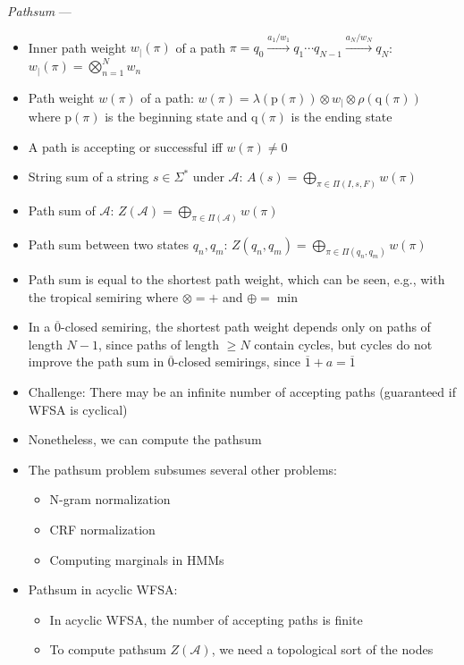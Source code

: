 \emph{Pathsum} ---
\begin{itemize}
    \item Inner path weight $w_\mid(\pi)$ of a path $\pi = q_0 \xrightarrow{a_1/w_1} q_1 \cdots q_{N-1} \xrightarrow{a_N/w_N} q_N$:
    $
    w_\mid(\pi) = \bigotimes_{n=1}^N w_n
    $
    \item Path weight $w(\pi)$ of a path:
    $
    w(\pi) = \lambda(\textrm{p}(\pi)) \otimes w_\mid \otimes \rho(\textrm{q}(\pi))
    $
    where $\textrm{p}(\pi)$ is the beginning state and $\textrm{q}(\pi)$ is the ending state
    \item A path is accepting or successful iff $w(\pi) \neq 0$
    \item String sum of a string $s \in \Sigma^*$ under $\mathcal{A}$:
    $
    A(s) = \bigoplus_{\pi \in \Pi(I, s, F)} w(\pi)
    $
    \item Path sum of $\mathcal{A}$:
    $
    Z(\mathcal{A}) = \bigoplus_{\pi \in \Pi(\mathcal{A})} w(\pi)
    $
    \item Path sum between two states $q_n, q_m$:
    $
    Z(q_n, q_m) = \bigoplus_{\pi \in \Pi(q_n, q_m)} w(\pi)
    $
    \item Path sum is equal to the shortest path weight, which can be seen, e.g., with the tropical semiring where $\otimes = +$ and $\oplus = \min$
    \item In a $\overline{0}$-closed semiring, the shortest path weight depends only on paths of length $N-1$, since paths of length $\geq N$ contain cycles, but cycles do not improve the path sum in $\overline{0}$-closed semirings, since $\overline{1} + a = \overline{1}$
    \item Challenge: There may be an infinite number of accepting paths (guaranteed if WFSA is cyclical)
    \item Nonetheless, we can compute the pathsum
    \item The pathsum problem subsumes several other problems:
    \begin{itemize}
        \item N-gram normalization
        \item CRF normalization
        \item Computing marginals in HMMs
    \end{itemize}
    \item Pathsum in acyclic WFSA:
    \begin{itemize}
        \item In acyclic WFSA, the number of accepting paths is finite
        \item To compute pathsum $Z(\mathcal{A})$, we need a topological sort of the nodes

\end{itemize}
\end{itemize}
